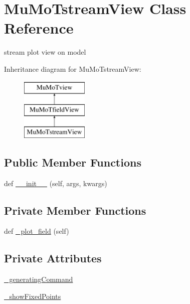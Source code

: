 \hypertarget{class_mu_mo_t_1_1_mu_mo_t_1_1_mu_mo_tstream_view}{}\section{Mu\+Mo\+Tstream\+View Class Reference}
\label{class_mu_mo_t_1_1_mu_mo_t_1_1_mu_mo_tstream_view}


stream plot view on model  


Inheritance diagram for Mu\+Mo\+Tstream\+View\+:\begin{figure}[H]
\begin{center}
\leavevmode
\includegraphics[height=3.000000cm]{class_mu_mo_t_1_1_mu_mo_t_1_1_mu_mo_tstream_view}
\end{center}
\end{figure}
\subsection*{Public Member Functions}
\begin{DoxyCompactItemize}
\item 
def \hyperlink{class_mu_mo_t_1_1_mu_mo_t_1_1_mu_mo_tstream_view_a302afe6819b093163cc8ea6f029c75da}{\+\_\+\+\_\+init\+\_\+\+\_\+} (self, args, kwargs)
\end{DoxyCompactItemize}
\subsection*{Private Member Functions}
\begin{DoxyCompactItemize}
\item 
def \hyperlink{class_mu_mo_t_1_1_mu_mo_t_1_1_mu_mo_tstream_view_a50d59419298116f738a98c864afb9d89}{\+\_\+plot\+\_\+field} (self)
\end{DoxyCompactItemize}
\subsection*{Private Attributes}
\begin{DoxyCompactItemize}
\item 
\hyperlink{class_mu_mo_t_1_1_mu_mo_t_1_1_mu_mo_tstream_view_ace48ed03490093d8f44cde91e2f1e86e}{\+\_\+generating\+Command}
\item 
\hyperlink{class_mu_mo_t_1_1_mu_mo_t_1_1_mu_mo_tstream_view_ac83a924ad62a2461d65b5c9bf9d27453}{\+\_\+show\+Fixed\+Points}
\end{DoxyCompactItemize}
